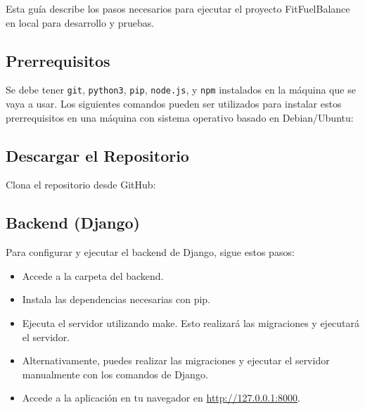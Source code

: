 Esta guía describe los pasos necesarios para ejecutar el proyecto FitFuelBalance en local para desarrollo y pruebas.

\subsection{Prerrequisitos}

Se debe tener \texttt{git}, \texttt{python3}, \texttt{pip}, \texttt{node.js}, y \texttt{npm} instalados en la máquina que se vaya a usar. Los siguientes comandos pueden ser utilizados para instalar estos prerrequisitos en una máquina con sistema operativo basado en Debian/Ubuntu:


\subsection{Descargar el Repositorio}

Clona el repositorio desde GitHub:


\subsection{Backend (Django)}

Para configurar y ejecutar el backend de Django, sigue estos pasos:


\begin{itemize}
    \item Accede a la carpeta del backend.
    \item Instala las dependencias necesarias con pip.
    \item Ejecuta el servidor utilizando make. Esto realizará las migraciones y ejecutará el servidor.
    \item Alternativamente, puedes realizar las migraciones y ejecutar el servidor manualmente con los comandos de Django.
    \item Accede a la aplicación en tu navegador en \url{http://127.0.0.1:8000}.
\end{itemize}

